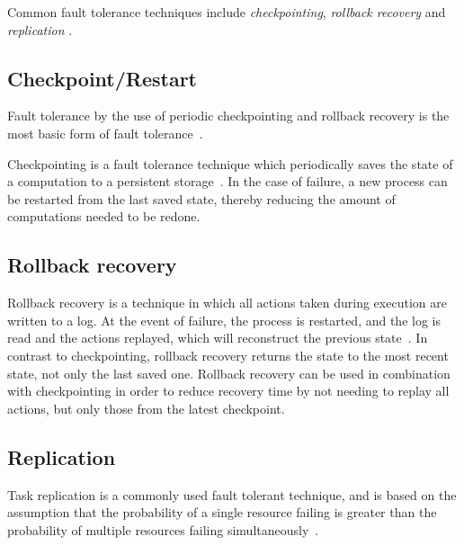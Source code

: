 \documentclass{cslthse-msc}
\begin{document}
Common fault tolerance techniques include \emph{checkpointing}, \emph{rollback recovery} and \emph{replication} \cite{relGridSystems}.

\subsection{Checkpoint/Restart} \label{subsec:background_checkpoint}
Fault tolerance by the use of periodic checkpointing and rollback recovery is the most basic form of fault tolerance~\cite{surveyFaultParallel}.

Checkpointing is a fault tolerance technique which periodically saves the state of a computation to a persistent storage~\cite{relGridSystems, surveyFaultParallel}. In the case of failure, a new process can be restarted from the last saved state, thereby reducing the amount of computations needed to be redone.


\subsection{Rollback recovery} \label{subsec:background_rollback}
Rollback recovery is a technique in which all actions taken during execution are written to a log. At the event of failure, the process is restarted, and the log is read and the actions replayed, which will reconstruct the previous state~\cite{surveyFaultParallel}. In contrast to checkpointing, rollback recovery returns the state to the most recent state, not only the last saved one. Rollback recovery can be used in combination with checkpointing in order to reduce recovery time by not needing to replay all actions, but only those from the latest checkpoint.

\subsection{Replication} \label{subsec:background_replication}
Task replication is a commonly used fault tolerant technique, and is based on the assumption that the probability of a single resource failing is greater than the probability of multiple resources failing simultaneously~\cite{faultToleranceGrid}.
\end{document}
